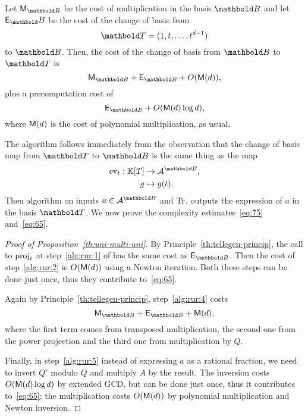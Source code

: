 \begin{proposition}
  \label{th:uni-multi-uni}
  Let $\Mult_{\basis{B}}$ be the cost of multiplication in the basis
  $\basis{B}$ and let $\mathsf{E}_\basis{B}$ be the cost of the change of basis from
    \begin{equation}
    \basis{T} = (1,t,\ldots,t^{d-1})
  \end{equation}
  to $\basis{B}$. Then, the cost of the change of basis from
  $\basis{B}$ to $\basis{T}$ is
  \begin{equation}
    \label{eq:75}
    \Mult_{\basis{B}} + \mathsf{E}_{\basis{B}} + O(\Mult(d))
    \text{,}
  \end{equation}
  plus a precomputation cost of
  \begin{equation}
    \label{eq:65}
    \mathsf{E}_{\basis{B}} + O(\Mult(d)\log d)
    \text{,}
  \end{equation}
  where $\mathsf{M}(d)$ is the cost of polynomial multiplication, as usual.
\end{proposition}

The algorithm follows immediately from the observation that the change
of basis map from $\basis{T}$ to $\basis{B}$ is the same thing as the
map
\begin{equation}
  \begin{aligned}
    \ev_t : \K[T] &\ra \algeb{A}^{\basis{B}}\text{,}\\
    g &\mapsto g(t)\text{.}
  \end{aligned}
\end{equation}
Then algorithm  on inputs
$a\in\algeb{A}^{\basis{B}}$ and $\operatorname{Tr}$, outputs the expression of $a$
in the basis $\basis{T}$. We now prove the complexity
estimates~\eqref{eq:75} and~\eqref{eq:65}.

\begin{proof}[Proof of Proposition~\ref{th:uni-multi-uni}]
  By Principle~\ref{th:tellegen-princip}, the call to $\operatorname{proj}_t$ at
  step~\ref{alg:rur:1} of  has the same cost as
  $\mathsf{E}_{\basis{B}}$. Then the cost of step~\ref{alg:rur:2} is
  $O(\mathsf{M}(d))$ using a Newton iteration. Both these steps can be done
  just once, thus they contribute to~\eqref{eq:65}.

  Again by Principle~\ref{th:tellegen-princip}, step~\ref{alg:rur:4}
  costs
  \begin{equation}
    \label{eq:80}
    \Mult_{\basis{B}} + \mathsf{E}_{\basis{B}} + \Mult(d)
    \text{,}
  \end{equation}
  where the first term comes from transposed multiplication, the
  second one from the power projection and the third one from
  multiplication by $Q$.

  Finally, in step~\ref{alg:rur:5} instead of expressing $a$ as a
  rational fraction, we need to invert $Q'$ modulo $Q$ and multiply
  $A$ by the result. The inversion costs $O(\mathsf{M}(d)\log d)$ by
  extended GCD, but can be done just once, thus it contributes
  to~\eqref{eq:65}; the multiplication costs $O(\mathsf{M}(d))$ by
  polynomial multiplication and Newton inversion.
\end{proof}



